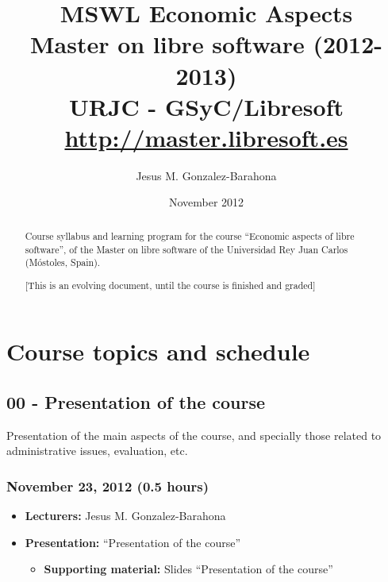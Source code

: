 \documentclass[a4paper]{article}
\title{MSWL Economic Aspects \\
Master on libre software (2012-2013)\\
URJC - GSyC/Libresoft \\
\url{http://master.libresoft.es}}
\author{Jesus M. Gonzalez-Barahona}
\date{November 2012}
\begin{document}
\maketitle

\begin{abstract}
Course syllabus and learning program for the course ``Economic aspects of libre software'', of the Master on libre software of the Universidad Rey Juan Carlos (Móstoles, Spain).

[This is an evolving document, until the course is finished and graded]
\end{abstract}

\tableofcontents

\section{Course topics and schedule}

\subsection{00 - Presentation of the course}

Presentation of the main aspects of the course, and specially those related to administrative issues, evaluation, etc.

\subsubsection{November 23, 2012 (0.5 hours)}

\begin{itemize}
\item \textbf{Lecturers:} Jesus M. Gonzalez-Barahona
\item \textbf{Presentation:} ``Presentation of the course''
  \begin{itemize}
  \item \textbf{Supporting material:} Slides ``Presentation of the course''
  \end{itemize}
\end{itemize}

\end{document}
